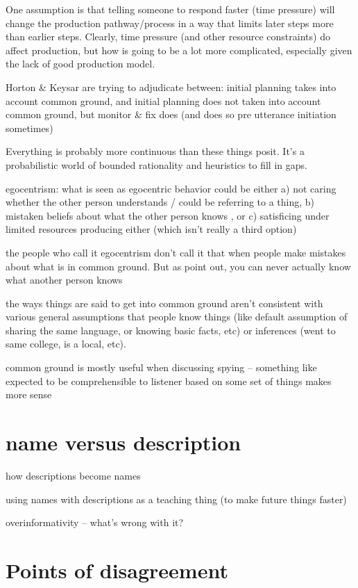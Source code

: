 \documentclass[]{article}
\begin{document}
One assumption is that telling someone to respond faster (time pressure) will change the production pathway/process in a way that limits later steps more than earlier steps. Clearly, time pressure (and other resource constraints) do affect production, but how is going to be a lot more complicated, especially given the lack of good production model. 

Horton \& Keysar are trying to adjudicate between: initial planning takes into account common ground, and initial planning does not taken into account common ground, but monitor \& fix does (and does so pre utterance initiation sometimes) 

Everything is probably more continuous than these things posit. It's a probabilistic world of bounded rationality and heuristics to fill in gaps. 

egocentrism: what is seen as egocentric behavior could be either a) not caring whether the other person understands / could be referring to a thing, b) mistaken beliefs about what the other person knows , or c) satisficing under limited resources producing either (which isn't really a third option) 

the people who call it egocentrism don't call it that when people make mistakes about what is in common ground. But as \cite{hanna2003} point out, you can never actually know what another person knows 

the ways things are said to get into common ground aren't consistent with various general assumptions that people know things (like default assumption of sharing the same language, or knowing basic facts, etc) or inferences (went to same college, is a local, etc). 

common ground is mostly useful when discussing spying -- something like expected to be comprehensible to listener based on some set of things makes more sense 

\section{name versus description}

how descriptions become names

using names with descriptions as a teaching thing (to make future things faster) 

overinformativity -- what's wrong with it? 

\section{Points of disagreement}
\end{document}
